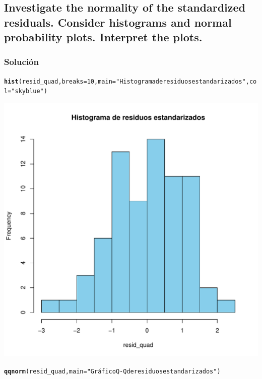 \documentclass[12pt]{article}\usepackage[]{graphicx}\usepackage[]{xcolor}
\makeatletter
\def\maxwidth{ %
  \ifdim\Gin@nat@width>\linewidth
    \linewidth
  \else
    \Gin@nat@width
  \fi
}
\newcommand{\hlnum}[1]{\textcolor[rgb]{0.686,0.059,0.569}{#1}}%
\newcommand{\hlsng}[1]{\textcolor[rgb]{0.192,0.494,0.8}{#1}}%
\newcommand{\hldef}[1]{\textcolor[rgb]{0.345,0.345,0.345}{#1}}%
\newcommand{\hlkwc}[1]{\textcolor[rgb]{0.333,0.667,0.333}{#1}}%
\newcommand{\hlkwd}[1]{\textcolor[rgb]{0.737,0.353,0.396}{\textbf{#1}}}%
\newenvironment{kframe}{%
 \def\at@end@of@kframe{}%
 \ifinner\ifhmode%
  \def\at@end@of@kframe{\end{minipage}}%
  \begin{minipage}{\columnwidth}%
 \fi\fi%
 \def\FrameCommand##1{\hskip\@totalleftmargin \hskip-\fboxsep
 \colorbox{shadecolor}{##1}\hskip-\fboxsep
     \hskip-\linewidth \hskip-\@totalleftmargin \hskip\columnwidth}%
 \MakeFramed {\advance\hsize-\width
   \@totalleftmargin\z@ \linewidth\hsize
   \@setminipage}}%
 {\par\unskip\endMakeFramed%
 \at@end@of@kframe}
\newenvironment{knitrout}{}{} %
\makeatother
\begin{document}
\subsection{Investigate the normality of the standardized residuals. Consider histograms and normal probability plots. Interpret the plots.}

\subsubsection{Solución}

\begin{knitrout}
\color{fgcolor}\begin{kframe}
\begin{alltt}
\hlkwd{hist}\hldef{(resid_quad,} \hlkwc{breaks} \hldef{=} \hlnum{10}\hldef{,} \hlkwc{main} \hldef{=} \hlsng{"Histograma de residuos estandarizados"}\hldef{,} \hlkwc{col} \hldef{=} \hlsng{"skyblue"}\hldef{)}
\end{alltt}
\end{kframe}
\includegraphics[width=\maxwidth]{figure/unnamed-chunk-19-1} 
\begin{kframe}\begin{alltt}
\hlkwd{qqnorm}\hldef{(resid_quad,} \hlkwc{main} \hldef{=} \hlsng{"Gráfico Q-Q de residuos estandarizados"}\hldef{)}

\end{alltt}
\end{kframe}
\end{knitrout}
\end{document}
